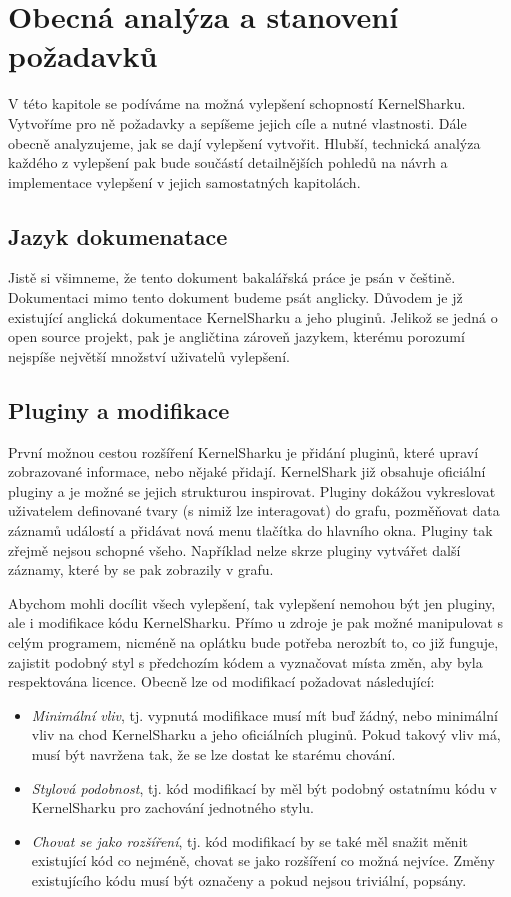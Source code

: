 \chapter{Obecná analýza a stanovení požadavků}
V této kapitole se podíváme na možná vylepšení schopností KernelSharku. Vytvoříme pro ně požadavky a sepíšeme jejich cíle a nutné vlastnosti. Dále obecně analyzujeme, jak se dají vylepšení vytvořit. Hlubší, technická analýza každého z vylepšení pak bude součástí detailnějších pohledů na návrh a implementace vylepšení v jejich samostatných kapitolách. 

\section{Jazyk dokumenatace}
Jistě si všimneme, že tento dokument bakalářská práce je psán v češtině. Dokumentaci mimo tento dokument budeme psát anglicky. Důvodem je jž existující anglická dokumentace KernelSharku a jeho pluginů. Jelikož se jedná o open source projekt, pak je angličtina zároveň jazykem, kterému porozumí nejspíše největší množství uživatelů vylepšení.

\section{Pluginy a modifikace}
První možnou cestou rozšíření KernelSharku je přidání pluginů, které upraví zobrazované informace, nebo nějaké přidají. KernelShark již obsahuje oficiální pluginy a je možné se jejich strukturou inspirovat. Pluginy dokážou vykreslovat uživatelem definované tvary (s nimiž lze interagovat) do grafu, pozměňovat data záznamů událostí a přidávat nová menu tlačítka do hlavního okna. Pluginy tak zřejmě nejsou schopné všeho. Například nelze skrze pluginy vytvářet další záznamy, které by se pak zobrazily v grafu.

Abychom mohli docílit všech vylepšení, tak vylepšení nemohou být jen pluginy, ale i modifikace kódu KernelSharku. Přímo u zdroje je pak možné manipulovat s celým programem, nicméně na oplátku bude potřeba nerozbít to, co již funguje, zajistit podobný styl s předchozím kódem a vyznačovat místa změn, aby byla respektována licence. Obecně lze od modifikací požadovat následující:
\begin{itemize}
    \item \emph{Minimální vliv}, tj. vypnutá modifikace musí mít buď žádný, nebo minimální vliv na chod KernelSharku a jeho oficiálních pluginů. Pokud takový vliv má, musí být navržena tak, že se lze dostat ke starému chování.
    \item \emph{Stylová podobnost}, tj. kód modifikací by měl být podobný ostatnímu kódu v KernelSharku pro zachování jednotného stylu.
    \item \emph{Chovat se jako rozšíření}, tj. kód modifikací by se také měl snažit měnit existující kód co nejméně, chovat se jako rozšíření co možná nejvíce. Změny existujícího kódu musí být označeny a pokud nejsou triviální, popsány.
\end{itemize}

